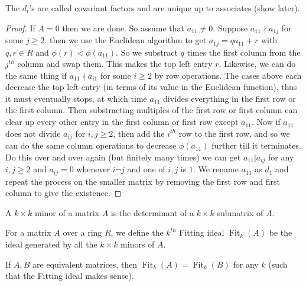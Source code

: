 The $d_i$'s are called covariant factors and are unique up to associates (show later).
\begin{proof}
    If $A=0$ then we are done.
    So assume that $a_{11}\neq 0$.
    Suppose $a_{11}\nmid a_{1j}$ for some $j\ge 2$, then we use the Euclidean algorithm to get $a_{1j}=qa_{11}+r$ with $q,r\in R$ and $\phi(r)<\phi(a_{11})$.
    So we substract $q$ times the first column from the $j^{th}$ column and swap them.
    This makes the top left entry $r$.
    Likewise, we can do the same thing if $a_{11}\nmid a_{i1}$ for some $i\ge 2$ by row operations.
    The cases above each decrease the top left entry (in terms of its value in the Euclidean function), thus it must eventually stops, at which time $a_{11}$ divides everything in the first row or the first column.
    Then substracting multiples of the first row or first column can clear up every other entry in the first column or first row except $a_{11}$.
    Now if $a_{11}$ does not divide $a_{ij}$ for $i,j\ge 2$, then add the $i^{th}$ row to the first row, and so we can do the same column operations to decrease $\phi(a_{11})$ further till it terminates.
    Do this over and over again (but finitely many times) we can get $a_{11}|a_{ij}$ for any $i,j\ge 2$ and $a_{ij}=0$ whenever $i\neg j$ and one of $i,j$ is $1$.
    We rename $a_{11}$ as $d_1$ and repeat the process on the smaller matrix by removing the first row and first column to give the existence.
\end{proof}
\begin{definition}
    A $k\times k$ minor of a matrix $A$ is the determinant of a $k\times k$ submatrix of $A$.
\end{definition}
\begin{definition}
    For a matrix $A$ over a ring $R$, we define the $k^{th}$ Fitting ideal $\operatorname{Fit}_k(A)$ be the ideal generated by all the $k\times k$ minors of $A$.
\end{definition}
\begin{lemma}
    If $A,B$ are equivalent matrices, then $\operatorname{Fit}_k(A)=\operatorname{Fit}_k(B)$ for any $k$ (such that the Fitting ideal makes sense).
\end{lemma}
